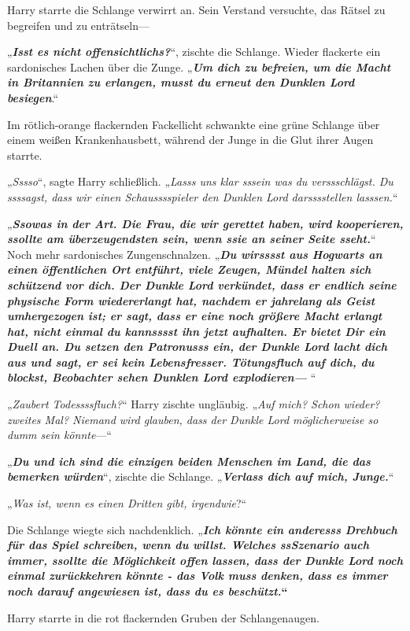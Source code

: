 {Harry starrte die Schlange verwirrt an. Sein Verstand versuchte, das Rätsel zu begreifen und zu enträtseln—

„\textbf{\emph{Isst es nicht offensichtlichs?}}“, zischte die Schlange. Wieder flackerte ein sardonisches Lachen über die Zunge. „\textbf{\emph{Um dich zu befreien, um die Macht in Britannien zu erlangen, musst du erneut den Dunklen Lord besiegen}}.“

Im rötlich-orange flackernden Fackellicht schwankte eine grüne Schlange über einem weißen Krankenhausbett, während der Junge in die Glut ihrer Augen starrte.

„\emph{Sssso}“, sagte Harry schließlich. „\emph{Lasss uns klar sssein was du verssschlägst. Du ssssagst, dass wir einen Schausssspieler den Dunklen Lord darsssstellen lasssen.}“

„\textbf{\emph{Ssowas in der Art. Die Frau, die wir gerettet haben, wird kooperieren, ssollte am überzeugendsten sein, wenn ssie an seiner Seite sseht.}}“ Noch mehr sardonisches Zungenschnalzen. „\textbf{\emph{Du wirsssst aus Hogwarts an einen öffentlichen Ort entführt, viele Zeugen, Mündel halten sich schützend vor dich. Der Dunkle Lord verkündet, dass er endlich seine physische Form wiedererlangt hat, nachdem er jahrelang als Geist umhergezogen ist; er sagt, dass er eine noch größere Macht erlangt hat, nicht einmal du kannsssst ihn jetzt aufhalten. Er bietet Dir ein Duell an. Du setzen den Patronusss ein, der Dunkle Lord lacht dich aus und sagt, er sei kein Lebensfresser. Tötungsfluch auf dich, du blockst, Beobachter sehen Dunklen Lord explodieren—} }“

„\emph{Zaubert Todessssfluch?}“ Harry zischte ungläubig. „\emph{Auf mich? Schon wieder? zweites Mal? Niemand wird glauben, dass der Dunkle Lord möglicherweise so dumm sein könnte}—“

„\textbf{\emph{Du und ich sind die einzigen beiden Menschen im Land, die das bemerken würden}}“, zischte die Schlange. „\textbf{\emph{Verlass dich auf mich, Junge.}}“

„\emph{Was ist, wenn es einen Dritten gibt, irgendwie}?“

Die Schlange wiegte sich nachdenklich. „\textbf{\emph{Ich könnte ein anderesss Drehbuch für das Spiel schreiben, wenn du willst. Welches ssSzenario auch immer, ssollte die Möglichkeit offen lassen, dass der Dunkle Lord noch einmal zurückkehren könnte - das Volk muss denken, dass es immer noch darauf angewiesen ist, dass du es beschützt.}“}

Harry starrte in die rot flackernden Gruben der Schlangenaugen.

}
